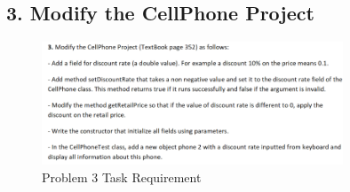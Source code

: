 \documentclass{article}
\begin{document}
\subsection*{3. Modify the CellPhone Project}

\begin{figure}[H]
    \centering

    \includegraphics[width=0.8\textwidth]{./Assets/Task requirements/Assignment7/3.png}
    \caption{Problem 3 Task Requirement}
\end{figure}
\end{document}
